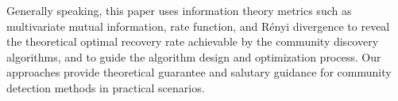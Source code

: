 \begin{abstract*}
  Generally speaking, this paper uses information theory metrics such as multivariate mutual information,
  rate function, and Rényi divergence to reveal the theoretical
  optimal recovery rate achievable by the community discovery algorithms,
  and to guide the algorithm design and optimization process.
  Our approaches provide theoretical guarantee and salutary guidance
  for community detection methods in practical scenarios.
\end{abstract*}

